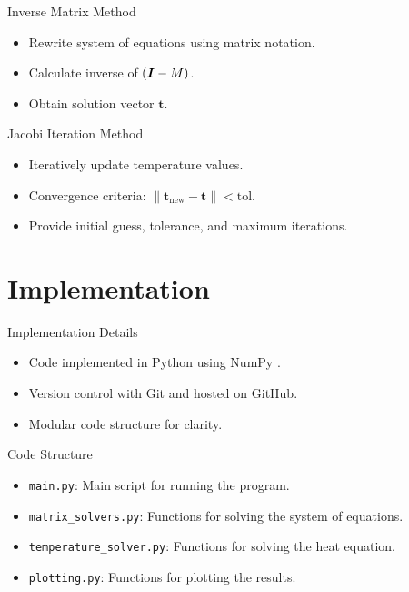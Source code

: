\documentclass[aspectratio=169]{beamer}
\begin{document}
\begin{frame}{Inverse Matrix Method}
  \begin{itemize}
    \item Rewrite system of equations using matrix notation.
    \item Calculate inverse of $(\textbf{\textit{I}} - M)$.
    \item Obtain solution vector $\textbf{t}$.
  \end{itemize}
\end{frame}

\begin{frame}{Jacobi Iteration Method}
  \begin{itemize}
    \item Iteratively update temperature values.
    \item Convergence criteria: $\|\textbf{t}_\text{new} - \textbf{t}\| < \text{tol}$.
    \item Provide initial guess, tolerance, and maximum iterations.
  \end{itemize}
\end{frame}

\section{Implementation}

\begin{frame}{Implementation Details}
  \begin{itemize}
    \item Code implemented in Python using NumPy \cite{gandhi}.
    \item Version control with Git and hosted on GitHub.
    \item Modular code structure for clarity.
  \end{itemize}
\end{frame}

\begin{frame}{Code Structure}
  \begin{itemize}
    \item \texttt{main.py}: Main script for running the program.
    \item \texttt{matrix\_solvers.py}: Functions for solving the system of equations.
    \item \texttt{temperature\_solver.py}: Functions for solving the heat equation.
    \item \texttt{plotting.py}: Functions for plotting the results.
  \end{itemize}
\end{frame}
\end{document}
